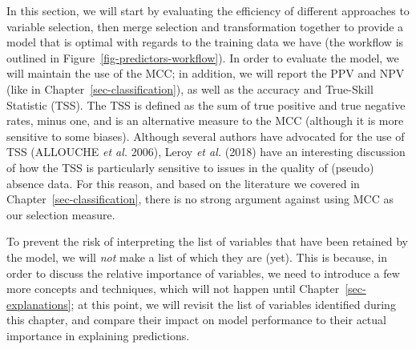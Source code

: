 \documentclass[
  letterpaper,
]{scrbook}
\begin{document}
In this section, we will start by evaluating the efficiency of different
approaches to variable selection, then merge selection and
transformation together to provide a model that is optimal with regards
to the training data we have (the workflow is outlined in
Figure~\ref{fig-predictors-workflow}). In order to evaluate the model,
we will maintain the use of the MCC; in addition, we will report the PPV
and NPV (like in Chapter~\ref{sec-classification}), as well as the
accuracy and True-Skill Statistic (TSS). The TSS is defined as the sum
of true positive and true negative rates, minus one, and is an
alternative measure to the MCC (although it is more sensitive to some
biases). Although several authors have advocated for the use of TSS
(ALLOUCHE \emph{et al.} 2006), Leroy \emph{et al.} (2018) have an
interesting discussion of how the TSS is particularly sensitive to
issues in the quality of (pseudo) absence data. For this reason, and
based on the literature we covered in Chapter~\ref{sec-classification},
there is no strong argument against using MCC as our selection measure.


To prevent the risk of interpreting the list of variables that have been
retained by the model, we will \emph{not} make a list of which they are
(yet). This is because, in order to discuss the relative importance of
variables, we need to introduce a few more concepts and techniques,
which will not happen until Chapter~\ref{sec-explanations}; at this
point, we will revisit the list of variables identified during this
chapter, and compare their impact on model performance to their actual
importance in explaining predictions.

\begin{figure}[bt]



\end{figure}%
\end{document}
